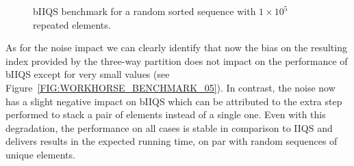 \begin{figure}
    \caption{bIIQS benchmark for a random sorted sequence with $1\times10^5$ repeated elements.}
    \label{FIG:WORKHORSE_BENCHMARK_04}
\end{figure}


As for the noise impact we can clearly identify that now the bias on the resulting index provided by the three-way partition does not impact on the performance of bIIQS except for very small values (see Figure~\ref{FIG:WORKHORSE_BENCHMARK_05}). In contrast, the noise now has a slight negative impact on bIIQS which can be attributed to the extra step performed to stack a pair of elements instead of a single one. Even with this degradation, the performance on all cases is stable in comparison to IIQS and delivers results in the expected running time, on par with random sequences of unique elements.\\


